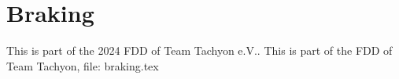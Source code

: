 \section{Braking}
This is part of the 2024 FDD of Team Tachyon e.V..
This is part of the FDD of Team Tachyon, file: braking.tex
